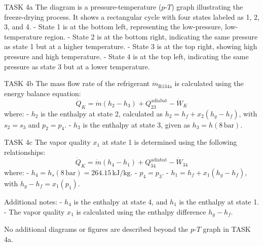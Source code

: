 TASK 4a  
The diagram is a pressure-temperature (\(p\)-\(T\)) graph illustrating the freeze-drying process. It shows a rectangular cycle with four states labeled as 1, 2, 3, and 4.  
- State 1 is at the bottom left, representing the low-pressure, low-temperature region.  
- State 2 is at the bottom right, indicating the same pressure as state 1 but at a higher temperature.  
- State 3 is at the top right, showing high pressure and high temperature.  
- State 4 is at the top left, indicating the same pressure as state 3 but at a lower temperature.  

TASK 4b  
The mass flow rate of the refrigerant \( \dot{m}_{\text{R134a}} \) is calculated using the energy balance equation:  
\[
\dot{Q}_K = \dot{m} (h_2 - h_3) + Q_{23}^{\text{adiabat}} - \dot{W}_K
\]  
where:  
- \( h_2 \) is the enthalpy at state 2, calculated as \( h_2 = h_f + x_2 (h_g - h_f) \), with \( s_2 = s_3 \) and \( p_2 = p_4 \).  
- \( h_3 \) is the enthalpy at state 3, given as \( h_3 = h(8 \, \text{bar}) \).  

TASK 4c  
The vapor quality \( x_1 \) at state 1 is determined using the following relationships:  
\[
\dot{Q}_K = \dot{m} (h_4 - h_1) + Q_{34}^{\text{adiabat}} - \dot{W}_{34}
\]  
where:  
- \( h_4 = h_s(8 \, \text{bar}) = 264.15 \, \text{kJ/kg} \).  
- \( p_4 = p_3 \).  
- \( h_1 = h_f + x_1 (h_g - h_f) \), with \( h_g - h_f = x_1 (p_1) \).  

Additional notes:  
- \( h_4 \) is the enthalpy at state 4, and \( h_1 \) is the enthalpy at state 1.  
- The vapor quality \( x_1 \) is calculated using the enthalpy difference \( h_g - h_f \).  

No additional diagrams or figures are described beyond the \(p\)-\(T\) graph in TASK 4a.
